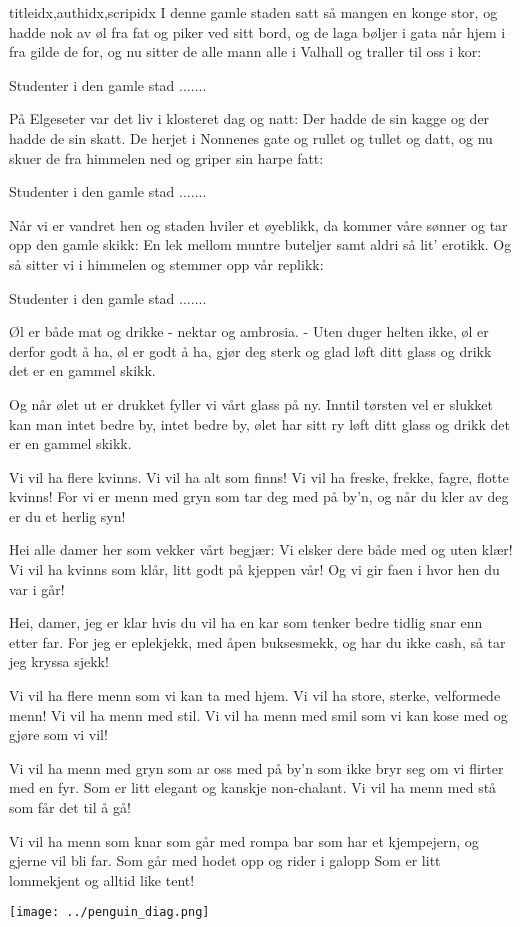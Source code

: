 \documentclass[14pt,letterpaper,norsk]{article}
\begin{document}
\begin{songs}{titleidx,authidx,scripidx}
\beginverse
I denne gamle staden satt så mangen en konge stor,
og hadde nok av øl fra fat og piker ved sitt bord,
og de laga bøljer i gata når hjem i fra gilde de for,
og nu sitter de alle mann alle i Valhall og traller til oss i kor:
\endverse

\beginchorus
Studenter i den gamle stad .......
\endchorus

\beginverse
På Elgeseter var det liv i klosteret dag og natt:
Der hadde de sin kagge og der hadde de sin skatt.
De herjet i Nonnenes gate og rullet og tullet og datt,
og nu skuer de fra himmelen ned og griper sin harpe fatt:
\endverse

\beginchorus
Studenter i den gamle stad .......
\endchorus

\beginverse
Når vi er vandret hen og staden hviler et øyeblikk,
da kommer våre sønner og tar opp den gamle skikk:
En lek mellom muntre buteljer samt aldri så lit' erotikk.
Og så sitter vi i himmelen og stemmer opp vår replikk:
\endverse

\beginchorus
Studenter i den gamle stad .......
\endchorus
\endsong

\beginverse
Øl er både mat og drikke - nektar og ambrosia. -
Uten duger helten ikke, øl er derfor godt å ha,
øl er godt å ha, gjør deg sterk og glad
løft ditt glass og drikk det er en gammel skikk.
\endverse

\beginverse
Og når ølet ut er drukket fyller vi vårt glass på ny.
Inntil tørsten vel er slukket kan man intet bedre by,
intet bedre by, ølet har sitt ry
løft ditt glass og drikk det er en gammel skikk.
\endverse
\endsong

\beginverse
Vi vil ha flere kvinns. 
Vi vil ha alt som finns! 
Vi vil ha freske, frekke, fagre, flotte kvinns! 
For vi er menn med gryn 
som tar deg med på by'n, 
og når du kler av deg 
er du et herlig syn! 
\endverse

\beginverse
Hei alle damer her 
som vekker vårt begjær: 
Vi elsker dere både med og uten klær! 
Vi vil ha kvinns som klår, 
litt godt på kjeppen vår! 
Og vi gir faen i hvor hen du var i går! 
\endverse

\beginverse
Hei, damer, jeg er klar 
hvis du vil ha en kar 
som tenker bedre tidlig snar enn etter far. 
For jeg er eplekjekk, 
med åpen buksesmekk, 
og har du ikke cash, 
så tar jeg kryssa sjekk! 
\endverse
\endsong

\beginverse
Vi vil ha flere menn
som vi kan ta med hjem.
Vi vil ha store, sterke, velformede menn!
Vi vil ha menn med stil.
Vi vil ha menn med smil
som vi kan kose med og gjøre som vi vil!
\endverse

\beginverse
Vi vil ha menn med gryn
som ar oss med på by'n
som ikke bryr seg om vi flirter med en fyr.
Som er litt elegant
og kanskje non-chalant.
Vi vil ha menn med stå som får det til å gå!
\endverse

\beginverse
Vi vil ha menn som knar
som går med rompa bar
som har et kjempejern, og gjerne vil bli far.
Som går med hodet opp
og rider i galopp
Som er litt lommekjent og alltid like tent!
\endverse
\endsong

\end{songs}

\newpage

\texttt{[image: ../penguin\_diag.png]}
\end{document}

